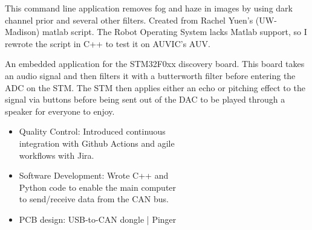 \documentclass[10pt,a4paper,ragged2e,withhyper]{altacv}
\begin{document}
\begin{paracol}{2}
This command line application removes fog and haze in images by using dark channel prior and several other filters. Created from Rachel Yuen's (UW-Madison) matlab script. The Robot Operating System lacks Matlab support, so I rewrote the script in C++ to test it on AUVIC's AUV.

An embedded application for the STM32F0xx discovery board. This board takes an audio signal and then filters it with a butterworth filter before entering the ADC on the STM. The STM then applies either an echo or pitching effect to the signal via buttons  before being sent out of the DAC to be played through a speaker for everyone to enjoy.










\switchcolumn










\begin{itemize}
\item Quality Control: Introduced continuous \\integration with Github Actions and agile \\workflows with Jira.
\item Software Development: Wrote C++ and \\Python code to enable the main computer \\to send/receive data from the CAN bus.  
\item PCB design: USB-to-CAN dongle | Pinger
\end{itemize}


\end{paracol}
\end{document}
